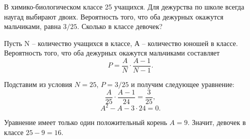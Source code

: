 
В химико-биологическом классе 25 учащихся. Для дежурства по школе всегда наугад выбирают двоих. Вероятность того, что оба дежурных окажутся мальчиками, равна $3/25$. Сколько в классе девочек?

\solutionSection

Пусть N -- количество учащихся в классе, А -- количество юношей в классе. Вероятность того, что оба дежурных окажутся мальчиками составляет 
$$P = \frac{A}{N}\cdot \frac{A - 1}{N - 1}.$$

Подставим из условия $N = 25$, $P = 3/25$ и получим следующее уравнение:
$$\frac{A}{25}\cdot\frac{A - 1}{24} = \frac{3}{25},$$
$$A^2 - A - 3 \cdot 24 = 0.$$

Уравнение имеет только один положительный корень $A = 9$. Значит, девочек в классе $25 - 9 = 16$.


